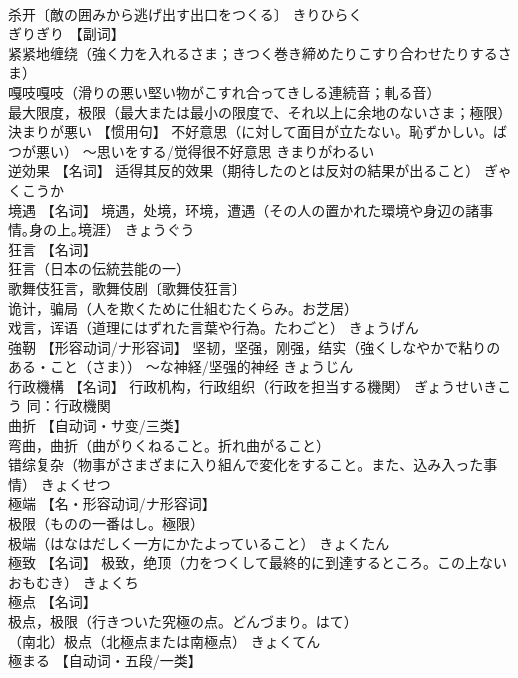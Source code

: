 \documentclass[8pt]{extreport}
\begin{document}
\begin{CJK}{UTF8}{min}
\\	杀开〔敵の囲みから逃げ出す出口をつくる〕	きりひらく	
\\	ぎりぎり	【副词】 
\\	紧紧地缠绕（強く力を入れるさま；きつく巻き締めたりこすり合わせたりするさま） 
\\	嘎吱嘎吱（滑りの悪い堅い物がこすれ合ってきしる連続音；軋る音） 
\\	最大限度，极限（最大または最小の限度で、それ以上に余地のないさま；極限）		
\\	決まりが悪い	【惯用句】 不好意思（に対して面目が立たない。恥ずかしい。ばつが悪い） ～思いをする/觉得很不好意思	きまりがわるい	
\\	逆効果	【名词】 适得其反的效果（期待したのとは反対の結果が出ること）	ぎゃくこうか	
\\	境遇	【名词】 境遇，处境，环境，遭遇（その人の置かれた環境や身辺の諸事情｡身の上｡境涯）	きょうぐう	
\\	狂言	【名词】 
\\	狂言（日本の伝統芸能の一） 
\\	歌舞伎狂言，歌舞伎剧〔歌舞伎狂言〕 
\\	诡计，骗局（人を欺くために仕組むたくらみ。お芝居） 
\\	戏言，诨语（道理にはずれた言葉や行為。たわごと）	きょうげん	
\\	強靭	【形容动词/ナ形容词】 坚韧，坚强，刚强，结实（強くしなやかで粘りのある・こと（さま）） ～な神経/坚强的神经	きょうじん	
\\	行政機構	【名词】 行政机构，行政组织（行政を担当する機関）	ぎょうせいきこう	同：行政機関
\\	曲折	【自动词・サ变/三类】 
\\	弯曲，曲折（曲がりくねること。折れ曲がること） 
\\	错综复杂（物事がさまざまに入り組んで変化をすること。また、込み入った事情）	きょくせつ	
\\	極端	【名・形容动词/ナ形容词】 
\\	极限（ものの一番はし。極限） 
\\	极端（はなはだしく一方にかたよっていること）	きょくたん	
\\	極致	【名词】 极致，绝顶（力をつくして最終的に到達するところ。この上ないおもむき）	きょくち	
\\	極点	【名词】 
\\	极点，极限（行きついた究極の点。どんづまり。はて） 
\\	（南北）极点（北極点または南極点）	きょくてん	
\\	極まる	【自动词・五段/一类】 

\end{CJK}
\end{document}
